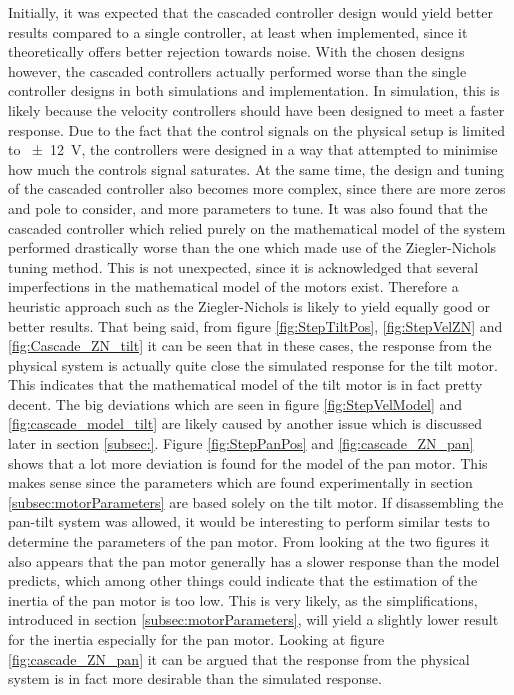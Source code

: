 \documentclass[../../main.tex]{subfiles}
\begin{document}
Initially, it was expected that the cascaded controller design would yield better results compared to a single controller, at least when implemented, since it theoretically offers better rejection towards noise. With the chosen designs however, the cascaded controllers actually performed worse than the single controller designs in both simulations and implementation. In simulation, this is likely because the velocity controllers should have been designed to meet a faster response. Due to the fact that the control signals on the physical setup is limited to \SI{\pm 12}{\volt}, the controllers were designed in a way that attempted to minimise how much the controls signal saturates. At the same time, the design and tuning of the cascaded controller also becomes more complex, since there are more zeros and pole to consider, and more parameters to tune. 
It was also found that the cascaded controller which relied purely on the mathematical model of the system performed drastically worse than the one which made use of the Ziegler-Nichols tuning method. This is not unexpected, since it is acknowledged that several imperfections in the mathematical model of the motors exist. Therefore a heuristic approach such as the Ziegler-Nichols is likely to yield equally good or better results. That being said, from figure \ref{fig:StepTiltPos}, \ref{fig:StepVelZN} and \ref{fig:Cascade_ZN_tilt} it can be seen that in these cases, the response from the physical system is actually quite close the simulated response for the tilt motor. This indicates that the mathematical model of the tilt motor is in fact pretty decent. The big deviations which are seen in figure \ref{fig:StepVelModel} and \ref{fig:cascade_model_tilt} are likely caused by another issue which is discussed later in section \ref{subsec:}. Figure \ref{fig:StepPanPos} and \ref{fig:cascade_ZN_pan} shows that a lot more deviation is found for the model of the pan motor. This makes sense since the parameters which are found experimentally in section \ref{subsec:motorParameters} are based solely on the tilt motor. If disassembling the pan-tilt system was allowed, it would be interesting to perform similar tests to determine the parameters of the pan motor. From looking at the two figures it also appears that the pan motor generally has a slower response than the model predicts, which among other things could indicate that the estimation of the inertia of the pan motor is too low. This is very likely, as the simplifications, introduced in section \ref{subsec:motorParameters}, will yield a slightly lower result for the inertia especially for the pan motor.  Looking at figure \ref{fig:cascade_ZN_pan} it can be argued that the response from the physical system is in fact more desirable than the simulated response.
\end{document}
